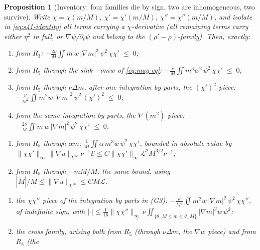 \documentclass[11pt]{article}
\newtheorem{proposition}[theorem]{Proposition}
\theoremstyle{definition}
\theoremstyle{remark}
\begin{document}
\begin{proposition}[Inventory: four families die by sign, two are
  inhomogeneous, two survive]\label{prop:s41-core}
  Write $\chi=\chi(m/M)$, $\chi'=\chi'(m/M)$, $\chi''=\chi''(m/M)$, and
  isolate in \eqref{eq:s41-identity} all terms carrying a
  $\chi$-derivative (all remaining terms carry either $\eta^2$ in full, or
  $\nabla\psi$/$\partial_t\psi$ and belong to the $(\rho'-\rho)$-family).
  Then, exactly:
  \begin{enumerate}[label=\textup{(G\arabic*)}]
    \item from $R_3$:
      $\displaystyle -\frac{2\nu}{M}\iint m\,w\,|\nabla m|^2\,\psi^2\,\chi\chi'
      \;\leq\;0$;
    \item from $R_5$ through the sink $-\nu mw$ of \eqref{eq:mag-eq}:
      $\displaystyle -\frac{\nu}{M}\iint m^3w^2\,\psi^2\,\chi\chi'\;\leq\;0$;
    \item from $R_5$ through $\nu\Delta m$, after one integration by parts,
      the $(\chi')^2$ piece:
      $\displaystyle -\frac{\nu}{M^2}\iint m^2w\,|\nabla m|^2\,\psi^2\,(\chi')^2
      \;\leq\;0$;
    \item from the same integration by parts, the $\nabla(m^2)$ piece:
      $\displaystyle -\frac{2\nu}{M}\iint m\,w\,|\nabla m|^2\,\psi^2\,\chi\chi'
      \;\leq\;0$.
  \end{enumerate}
  \begin{enumerate}[label=\textup{(I\arabic*)}]
    \item from $R_5$ through $\alpha m$:
      $\displaystyle \frac{1}{M}\iint \alpha\,m^3w\,\psi^2\,\chi\chi'$,
      bounded in absolute value by
      $\|\chi\chi'\|_\infty\,\|\nabla u\|_{L^\infty}\nu^{-1}\mathcal{E}
      \leq C\|\chi\chi'\|_\infty\mathcal{L}^2M^{3/2}\nu^{-1}$;
    \item from $R_5$ through $-m\dot M/M$: the same bound, using
      $|\dot M|/M\leq\|\nabla u\|_{L^\infty}\leq CM\mathcal{L}$.
  \end{enumerate}
  \begin{enumerate}[label=\textup{(S\arabic*)}]
    \item the $\chi\chi''$ piece of the integration by parts in (G3):
      $\displaystyle -\frac{\nu}{M^2}\iint m^2w\,|\nabla m|^2\,\psi^2\,\chi\chi''$,
      of \emph{indefinite} sign, with
      $|{\cdot}|\leq\tfrac{1}{16}\|\chi\chi''\|_\infty\,
      \nu\iint_{\{\theta_-M\leq m\leq\theta_+M\}}|\nabla m|^2w\,\psi^2$;
    \item the cross family, arising both from $R_5$ (through
      $\nu\Delta m$, the $\nabla w$ piece) and from $R_4$ (the

\end{enumerate}
\end{proposition}
\end{document}
